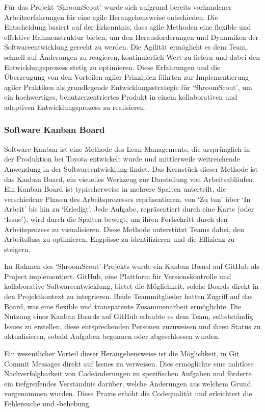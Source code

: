 \documentclass[../main.tex]{subfiles} %
\begin{document}
Für das Projekt `ShroomScout' wurde sich aufgrund bereits vorhandener Arbeitserfahrungen für eine agile Herangehensweise entschieden. Die
Entscheidung basiert auf der Erkenntnis, dass agile Methoden eine flexible und effektive Rahmenstruktur bieten, um den Herausforderungen
und Dynamiken der Softwareentwicklung gerecht zu werden. Die Agilität ermöglicht es dem Team, schnell auf Änderungen zu reagieren, kontinuierlich
Wert zu liefern und dabei den Entwicklungsprozess stetig zu optimieren. Diese Erfahrungen und die Überzeugung von den Vorteilen agiler Prinzipien
führten zur Implementierung agiler Praktiken als grundlegende Entwicklungsstrategie für `ShroomScout', um ein hochwertiges, benutzerzentriertes
Produkt in einem kollaborativen und adaptiven Entwicklungsprozess zu realisieren.

\subsubsection{Software Kanban Board}

Software Kanban ist eine Methode des Lean Managements, die ursprünglich in der Produktion bei Toyota entwickelt wurde und mittlerweile weitreichende
Anwendung in der Softwareentwicklung findet. Das Kernstück dieser Methode ist das Kanban Board, ein visuelles Werkzeug zur Darstellung von Arbeitsabläufen.
Ein Kanban Board ist typischerweise in mehrere Spalten unterteilt, die verschiedene Phasen des Arbeitsprozesses repräsentieren, von `Zu tun' über `In Arbeit'
bis hin zu `Erledigt'. Jede Aufgabe, repräsentiert durch eine Karte (oder `Issue'), wird durch die Spalten bewegt, um ihren Fortschritt durch den Arbeitsprozess
zu visualisieren. Diese Methode unterstützt Teams dabei, den Arbeitsfluss zu optimieren, Engpässe zu identifizieren und die Effizienz zu steigern.

Im Rahmen des `ShroomScout'-Projekts wurde ein Kanban Board auf GitHub als Project implementiert. GitHub, eine Plattform für Versionskontrolle und kollaborative
Softwareentwicklung, bietet die Möglichkeit, solche Boards direkt in den Projektkontext zu integrieren. Beide Teammitglieder hatten Zugriff auf das Board, was
eine flexible und transparente Zusammenarbeit ermöglichte. Die Nutzung eines Kanban Boards auf GitHub erlaubte es dem Team, selbstständig Issues zu erstellen,
diese entsprechenden Personen zuzuweisen und ihren Status zu aktualisieren, sobald Aufgaben begonnen oder abgeschlossen wurden.

Ein wesentlicher Vorteil dieser Herangehensweise ist die Möglichkeit, in Git Commit Messages direkt auf Issues zu verweisen. Dies ermöglichte eine nahtlose
Nachverfolgbarkeit von Codeänderungen zu spezifischen Aufgaben und förderte ein tiefgreifendes Verständnis darüber, welche Änderungen aus welchem Grund
vorgenommen wurden. Diese Praxis erhöht die Codequalität und erleichtert die Fehlersuche und -behebung.
\end{document}
